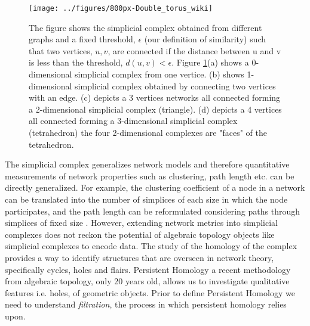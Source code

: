 \documentclass[onecollarge,runningheads]{svjour2}
\begin{document}
\begin{figure}[h]
        \centering
        \texttt{[image: ../figures/800px-Double\_torus\_wiki]}
        \caption{The figure shows the simplicial complex obtained from different graphs and a fixed threshold, $\epsilon$ (our definition of similarity) such that two vertices, $u, v$, are connected if the distance between u and v is less than the threshold, $d(u,v) < \epsilon$. Figure \ref{fig:vrcomplex}(a) shows a 0-dimensional simplicial complex from one vertice. (b) shows 1-dimensional simplicial complex obtained by connecting two vertices with an edge.  (c) depicts a 3 vertices networks all connected forming a 2-dimensional simplicial complex (triangle). (d) depicts a 4 vertices all connected forming a 3-dimensional simplicial complex (tetrahedron) the four 2-dimensional complexes are "faces" of the tetrahedron.}
\label{fig:vrcomplex}
\end{figure}

The simplicial complex generalizes network models and therefore quantitative measurements of network properties such as clustering, path length etc. can be directly generalized. For example, the clustering coefficient of a node in a network can be translated into the number of simplices of each size in which the node participates, and the path length can be reformulated considering paths through simplices of fixed size \cite{dotko2016topological}. However, extending network metrics into simplicial complexes does not reckon the potential of algebraic topology objects like simplicial complexes to encode data.
The study of the homology of the complex provides a way to identify structures that are overseen in network theory, specifically cycles, holes and flairs. Persistent Homology a recent methodology from algebraic topology, only 20 years old, allows us to investigate qualitative features i.e. holes, of geometric objects. Prior to define Persistent Homology we need to understand \emph{filtration}, the process in which persistent homology relies upon.
\end{document}
